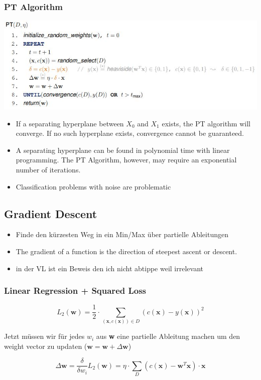 \documentclass[11pt,a4paper]{article}
\begin{document}
\begin{flushleft}
\subsubsection{PT Algorithm}
\includegraphics[width=\textwidth]{PT}
\begin{itemize}
\item If a separating hyperplane between $X_0$ and $X_1$ exists, the PT algorithm will
converge. If no such hyperplane exists, convergence cannot be guaranteed.
\item A separating hyperplane can be found in polynomial time with linear
programming. The PT Algorithm, however, may require an exponential
number of iterations.
\item Classification problems with noise are problematic
\end{itemize}
\subsection{Gradient Descent}
\begin{itemize}
\item Finde den kürzesten Weg in ein Min/Max über partielle Ableitungen
\item The gradient of a function is the direction of steepest ascent or descent.
\item in der VL ist ein Beweis den ich nicht abtippe weil irrelevant 
\end{itemize}
\subsubsection{Linear Regression + Squared Loss}

$$ L_2(\textbf{w}) = \dfrac{1}{2} \cdot \displaystyle\sum_{(\textbf{x}, c(\textbf{x})) \in D} (c(\textbf{x}) - y(\textbf{x}))^2$$

Jetzt müssen wir für jedes $w_i$ aus \textbf{w} eine partielle Ableitung machen um den weight vector zu updaten ($ \textbf{w} = \textbf{w} + \Delta \textbf{w}$)

$$ \Delta\textbf{w} =  \dfrac{ \delta }{\delta w_i} L_2 (\textbf{w}) = \eta \cdot \displaystyle\sum_D (c(\textbf{x}) - \textbf{w}^T\textbf{x}) \cdot \textbf{x}$$


\end{flushleft}
\end{document}
